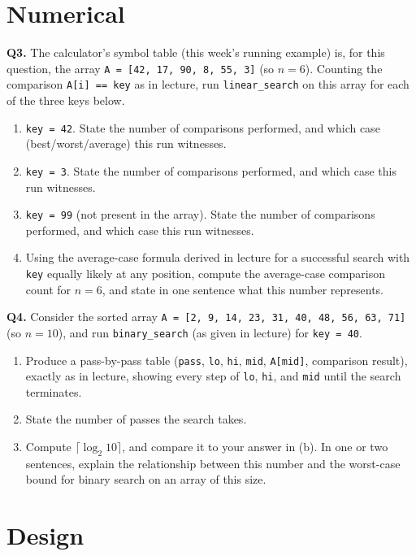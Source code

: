 \documentclass[11pt]{article}
\begin{document}
\section{Numerical}

\textbf{Q3.} The calculator's symbol table (this week's running example) is, for this question, the array \texttt{A = [42, 17, 90, 8, 55, 3]} (so $n = 6$). Counting the comparison \texttt{A[i] == key} as in lecture, run \texttt{linear\_search} on this array for each of the three keys below.
\begin{enumerate}
  \item[(a)] \texttt{key = 42}. State the number of comparisons performed, and which case (best/worst/average) this run witnesses.
  \item[(b)] \texttt{key = 3}. State the number of comparisons performed, and which case this run witnesses.
  \item[(c)] \texttt{key = 99} (not present in the array). State the number of comparisons performed, and which case this run witnesses.
  \item[(d)] Using the average-case formula derived in lecture for a successful search with \texttt{key} equally likely at any position, compute the average-case comparison count for $n = 6$, and state in one sentence what this number represents.
\end{enumerate}

\textbf{Q4.} Consider the sorted array \texttt{A = [2, 9, 14, 23, 31, 40, 48, 56, 63, 71]} (so $n = 10$), and run \texttt{binary\_search} (as given in lecture) for \texttt{key = 40}.
\begin{enumerate}
  \item[(a)] Produce a pass-by-pass table (\texttt{pass}, \texttt{lo}, \texttt{hi}, \texttt{mid}, \texttt{A[mid]}, comparison result), exactly as in lecture, showing every step of \texttt{lo}, \texttt{hi}, and \texttt{mid} until the search terminates.
  \item[(b)] State the number of passes the search takes.
  \item[(c)] Compute $\lceil \log_2 10 \rceil$, and compare it to your answer in (b). In one or two sentences, explain the relationship between this number and the worst-case bound for binary search on an array of this size.
\end{enumerate}

\section{Design}
\end{document}

